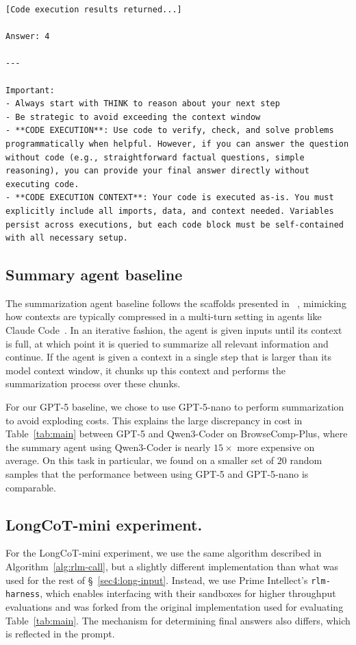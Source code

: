 \begin{lstlisting}[style=customstyle]
[Code execution results returned...]

Answer: 4

---

Important: 
- Always start with THINK to reason about your next step
- Be strategic to avoid exceeding the context window
- **CODE EXECUTION**: Use code to verify, check, and solve problems programmatically when helpful. However, if you can answer the question without code (e.g., straightforward factual questions, simple reasoning), you can provide your final answer directly without executing code.
- **CODE EXECUTION CONTEXT**: Your code is executed as-is. You must explicitly include all imports, data, and context needed. Variables persist across executions, but each code block must be self-contained with all necessary setup.
\end{lstlisting}

\subsection{Summary agent baseline}
The summarization agent baseline follows the scaffolds presented in ~\citet{sun2025scalinglonghorizonllmagent, wu2025resumunlockinglonghorizonsearch, yu2025memagentreshapinglongcontextllm}, mimicking how contexts are typically compressed in a multi-turn setting in agents like Claude Code~\citep{anthropic_claude_code_subagents}. In an iterative fashion, the agent is given inputs until its context is full, at which point it is queried to summarize all relevant information and continue. If the agent is given a context in a single step that is larger than its model context window, it chunks up this context and performs the summarization process over these chunks.

For our GPT-5 baseline, we chose to use GPT-5-nano to perform summarization to avoid exploding costs. This explains the large discrepancy in cost in Table~\ref{tab:main} between GPT-5 and Qwen3-Coder on BrowseComp-Plus, where the summary agent using Qwen3-Coder is nearly $15\times$ more expensive on average. On this task in particular, we found on a smaller set of $20$ random samples that the performance between using GPT-5 and GPT-5-nano is comparable.

\subsection{LongCoT-mini experiment.} \label{appx:longcot}
For the LongCoT-mini \RLM{} experiment, we use the same \RLM{} algorithm described in Algorithm~\ref{alg:rlm-call}, but a slightly different implementation than what was used for the rest of \S~\ref{sec4:long-input}. Instead, we use Prime Intellect's \texttt{rlm-harness}, which enables interfacing with their sandboxes for higher throughput evaluations and was forked from the original implementation used for evaluating Table~\ref{tab:main}. The mechanism for determining final answers also differs, which is reflected in the prompt.

